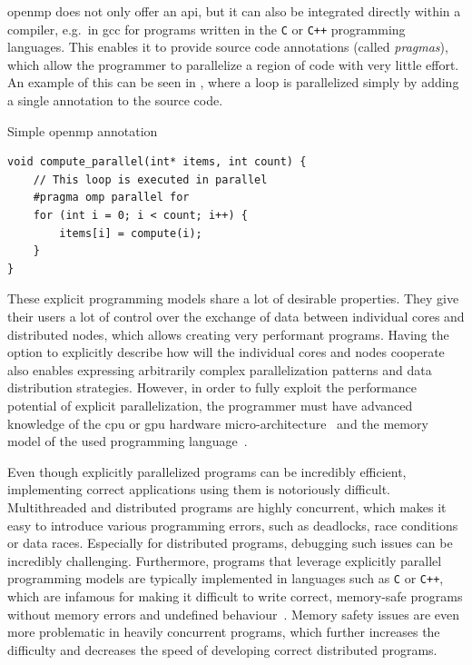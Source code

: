 \begin{description}
		\gls{openmp} does not only offer an \gls{api}, but it can also be
		integrated directly within a compiler, e.g.\ in \gls{gcc} for programs written in
		the \texttt{C} or \texttt{C++} programming languages. This enables it
		to provide source code annotations (called \emph{pragmas}), which allow the programmer
		to parallelize a region of code with very little effort. An example of this can be seen in
		, where a loop is parallelized simply by adding a single annotation to
		the source code.

		\begin{listing}
			\caption{Simple \gls{openmp} annotation}
			\label{lst:openmp-annotation}
			\begin{verbatim}
void compute_parallel(int* items, int count) {
    // This loop is executed in parallel
    #pragma omp parallel for
    for (int i = 0; i < count; i++) {
        items[i] = compute(i);
    }
}
        \end{verbatim}
		\end{listing}
\end{description}

These explicit programming models share a lot of desirable properties. They give their users a lot
of control over the exchange of data between individual cores and distributed nodes, which allows
creating very performant programs. Having the option to explicitly describe how will the individual
cores and nodes cooperate also enables expressing arbitrarily complex parallelization patterns and
data distribution strategies. However, in order to fully exploit the performance potential of
explicit parallelization, the programmer must have advanced knowledge of the
\gls{cpu} or \gls{gpu} hardware
micro-architecture~\cite{intel_developer_manual} and the memory model of the used programming
language~\cite{cpp11_standard}.

Even though explicitly parallelized programs can be incredibly efficient, implementing correct
applications using them is notoriously difficult. Multithreaded and distributed programs are highly
concurrent, which makes it easy to introduce various programming errors, such as deadlocks, race
conditions or data races. Especially for distributed programs, debugging such issues can be
incredibly challenging. Furthermore, programs that leverage explicitly parallel programming models
are typically implemented in languages such as \texttt{C} or
\texttt{C++}, which are infamous for making it difficult to write correct,
memory-safe programs without memory errors and undefined behaviour~\cite{memory_safety_report}.
Memory safety issues are even more problematic in heavily concurrent programs, which further
increases the difficulty and decreases the speed of developing correct distributed programs.

